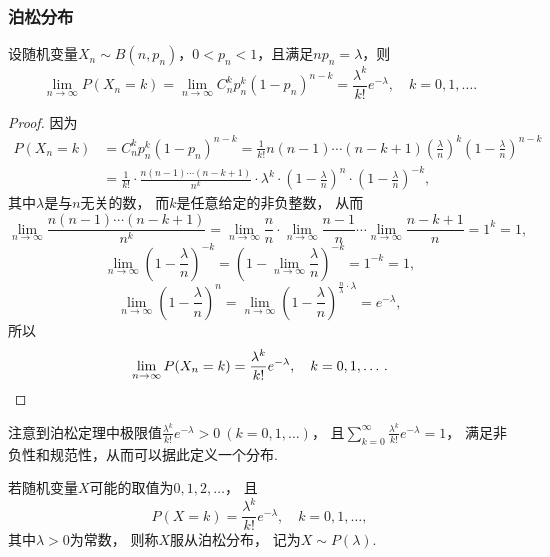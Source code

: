\subsubsection{泊松分布}
\begin{theorem}[泊松定理]
设随机变量\(X_n \sim B(n,p_n)\)，\(0 < p_n < 1\)，且满足\(n p_n = \lambda\)，则\begin{equation}
	\lim\limits_{n\to\infty} P(X_n=k)
	= \lim\limits_{n\to\infty} C_n^k p_n^k (1-p_n)^{n-k}
	= \frac{\lambda^k}{k!} e^{-\lambda},
	\quad k=0,1,\dotsc.
\end{equation}
\begin{proof}
因为\begin{align*}
	P(X_n=k) &= C_n^k p_n^k (1-p_n)^{n-k}
	= \frac{1}{k!} n(n-1)\dotsm(n-k+1)
	\left(\frac{\lambda}{n}\right)^k
	\left(1-\frac{\lambda}{n}\right)^{n-k} \\
	&= \frac{1}{k!}
	\cdot \frac{n(n-1)\dotsm(n-k+1)}{n^k}
	\cdot \lambda^k
	\cdot \left(1-\frac{\lambda}{n}\right)^n
	\cdot \left(1-\frac{\lambda}{n}\right)^{-k},
\end{align*}
其中\(\lambda\)是与\(n\)无关的数，
而\(k\)是任意给定的非负整数，
从而\[
	\lim\limits_{n\to\infty} \frac{n(n-1)\dotsm(n-k+1)}{n^k}
	= \lim\limits_{n\to\infty} \frac{n}{n}
	\cdot \lim\limits_{n\to\infty} \frac{n-1}{n}
	\dotsm \lim\limits_{n\to\infty} \frac{n-k+1}{n}
	= 1^k = 1,
\]\[
	\lim\limits_{n\to\infty} \left(1-\frac{\lambda}{n}\right)^{-k}
	= \left(1-\lim\limits_{n\to\infty} \frac{\lambda}{n}\right)^{-k}
	= 1^{-k} = 1,
\]\[
	\lim\limits_{n\to\infty} \left(1-\frac{\lambda}{n}\right)^n
	= \lim\limits_{n\to\infty}
	\left(1-\frac{\lambda}{n}\right)^{\frac{n}{\lambda} \cdot \lambda}
	= e^{-\lambda},
\]
所以\[
	\lim\limits_{n\to\infty} P(X_n=k)
	= \frac{\lambda^k}{k!} e^{-\lambda},
	\quad k=0,1,\dotsc.
	\qedhere
\]
\end{proof}
\end{theorem}

注意到泊松定理中极限值\(\frac{\lambda^k}{k!} e^{-\lambda} > 0\ (k=0,1,\dotsc)\)，
且\(\sum\limits_{k=0}^\infty \frac{\lambda^k}{k!} e^{-\lambda} = 1\)，
满足非负性和规范性，从而可以据此定义一个分布.

\begin{definition}
若随机变量\(X\)可能的取值为\(0,1,2,\dotsc\)，
且\begin{equation}\label{equation:随机变量及其分布.泊松分布的分布律}
	P(X=k) = \frac{\lambda^k}{k!} e^{-\lambda},
	\quad k=0,1,\dotsc,
\end{equation}
其中\(\lambda > 0\)为常数，
则称\(X\)服从泊松分布，
记为\(X \sim P(\lambda)\).
\end{definition}

